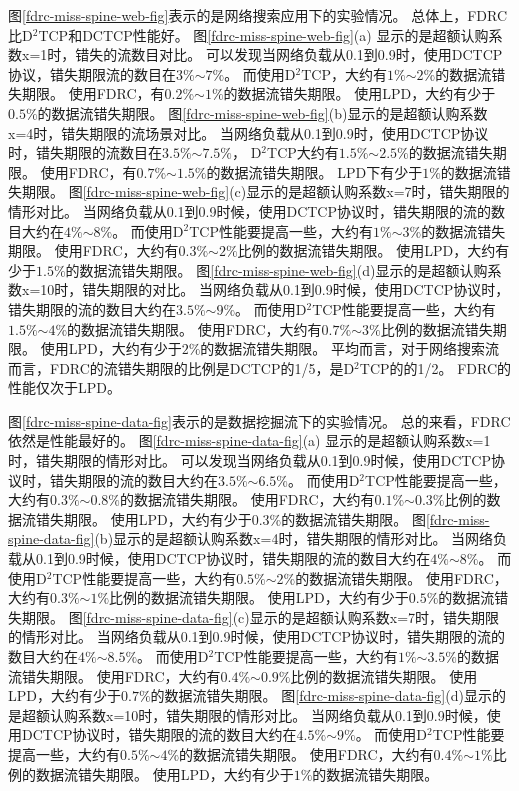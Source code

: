 图\ref{fdrc-miss-spine-web-fig}表示的是网络搜索应用下的实验情况。
总体上，FDRC比D$^2$TCP和DCTCP性能好。
图\ref{fdrc-miss-spine-web-fig}(a) 显示的是超额认购系数x=1时，错失的流数目对比。
可以发现当网络负载从0.1到0.9时，使用DCTCP协议，错失期限流的数目在$3\%$$ \sim$$7\%$。
而使用D$^2$TCP，大约有$1\%$$ \sim $$2\%$的数据流错失期限。
使用FDRC，有$0.2\%$$ \sim $$1\%$的数据流错失期限。
使用LPD，大约有少于$0.5\%$的数据流错失期限。
图\ref{fdrc-miss-spine-web-fig}(b)显示的是超额认购系数x=4时，错失期限的流场景对比。
当网络负载从0.1到0.9时，使用DCTCP协议时，错失期限的流数目在$3.5\%$$ \sim$$7.5\%$，
D$^2$TCP大约有$1.5\%$$ \sim $$2.5\%$的数据流错失期限。
使用FDRC，有$0.7\%$$ \sim $$1.5\%$的数据流错失期限。
LPD下有少于$1\%$的数据流错失期限。
图\ref{fdrc-miss-spine-web-fig}(c)显示的是超额认购系数x=7时，错失期限的情形对比。
当网络负载从0.1到0.9时候，使用DCTCP协议时，错失期限的流的数目大约在$4\%$$ \sim$$8\%$。
而使用D$^2$TCP性能要提高一些，大约有$1\%$$ \sim $$3\%$的数据流错失期限。
使用FDRC，大约有$0.3\%$$ \sim $$2\%$比例的数据流错失期限。
使用LPD，大约有少于$1.5\%$的数据流错失期限。
图\ref{fdrc-miss-spine-web-fig}(d)显示的是超额认购系数x=10时，错失期限的对比。
当网络负载从0.1到0.9时候，使用DCTCP协议时，错失期限的流的数目大约在$3.5\%$$ \sim$$9\%$。
而使用D$^2$TCP性能要提高一些，大约有$1.5\%$$ \sim $$4\%$的数据流错失期限。
使用FDRC，大约有$0.7\%$$ \sim $$3\%$比例的数据流错失期限。
使用LPD，大约有少于$2\%$的数据流错失期限。
平均而言，对于网络搜索流而言，FDRC的流错失期限的比例是DCTCP的1/5，是D$^2$TCP的的1/2。
FDRC的性能仅次于LPD。


图\ref{fdrc-miss-spine-data-fig}表示的是数据挖掘流下的实验情况。
总的来看，FDRC依然是性能最好的。
图\ref{fdrc-miss-spine-data-fig}(a) 显示的是超额认购系数x=1时，错失期限的情形对比。
可以发现当网络负载从0.1到0.9时候，使用DCTCP协议时，错失期限的流的数目大约在$3.5\%$$ \sim$$6.5\%$。
而使用D$^2$TCP性能要提高一些，大约有$0.3\%$$ \sim $$0.8\%$的数据流错失期限。
使用FDRC，大约有$0.1\%$$ \sim $$0.3\%$比例的数据流错失期限。
使用LPD，大约有少于$0.3\%$的数据流错失期限。
图\ref{fdrc-miss-spine-data-fig}(b)显示的是超额认购系数x=4时，错失期限的情形对比。
当网络负载从0.1到0.9时候，使用DCTCP协议时，错失期限的流的数目大约在$4\%$$ \sim$$8\%$。
而使用D$^2$TCP性能要提高一些，大约有$0.5\%$$ \sim $$2\%$的数据流错失期限。
使用FDRC，大约有$0.3\%$$ \sim $$1\%$比例的数据流错失期限。
使用LPD，大约有少于$0.5\%$的数据流错失期限。
图\ref{fdrc-miss-spine-data-fig}(c)显示的是超额认购系数x=7时，错失期限的情形对比。
当网络负载从0.1到0.9时候，使用DCTCP协议时，错失期限的流的数目大约在$4\%$$ \sim$$8.5\%$。
而使用D$^2$TCP性能要提高一些，大约有$1\%$$ \sim $$3.5\%$的数据流错失期限。
使用FDRC，大约有$0.4\%$$ \sim $$0.9\%$比例的数据流错失期限。
使用LPD，大约有少于$0.7\%$的数据流错失期限。
图\ref{fdrc-miss-spine-data-fig}(d)显示的是超额认购系数x=10时，错失期限的情形对比。
当网络负载从0.1到0.9时候，使用DCTCP协议时，错失期限的流的数目大约在$4.5\%$$ \sim$$9\%$。
而使用D$^2$TCP性能要提高一些，大约有$0.5\%$$ \sim $$4\%$的数据流错失期限。
使用FDRC，大约有$0.4\%$$ \sim $$1\%$比例的数据流错失期限。
使用LPD，大约有少于$1\%$的数据流错失期限。


